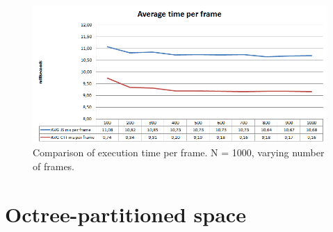 \begin{figure}[h!]
  \caption{Comparison of execution time per frame. N = 1000, varying number of frames.}
  \label{img:spheres1-time-per-frame}
  \centering
	\includegraphics[width=16cm]{spheres/time-per-frame.png}
\end{figure} 


\section{Octree-partitioned space}
\label{sec:sphereoctree}

